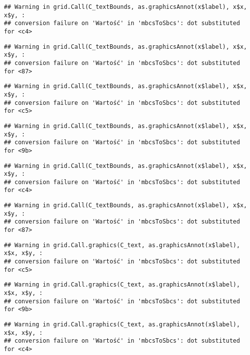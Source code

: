 \documentclass[
]{book}
\begin{document}
\begin{verbatim}
## Warning in grid.Call(C_textBounds, as.graphicsAnnot(x$label), x$x, x$y, :
## conversion failure on 'Wartość' in 'mbcsToSbcs': dot substituted for <c4>
\end{verbatim}

\begin{verbatim}
## Warning in grid.Call(C_textBounds, as.graphicsAnnot(x$label), x$x, x$y, :
## conversion failure on 'Wartość' in 'mbcsToSbcs': dot substituted for <87>
\end{verbatim}

\begin{verbatim}
## Warning in grid.Call(C_textBounds, as.graphicsAnnot(x$label), x$x, x$y, :
## conversion failure on 'Wartość' in 'mbcsToSbcs': dot substituted for <c5>
\end{verbatim}

\begin{verbatim}
## Warning in grid.Call(C_textBounds, as.graphicsAnnot(x$label), x$x, x$y, :
## conversion failure on 'Wartość' in 'mbcsToSbcs': dot substituted for <9b>
\end{verbatim}

\begin{verbatim}
## Warning in grid.Call(C_textBounds, as.graphicsAnnot(x$label), x$x, x$y, :
## conversion failure on 'Wartość' in 'mbcsToSbcs': dot substituted for <c4>
\end{verbatim}

\begin{verbatim}
## Warning in grid.Call(C_textBounds, as.graphicsAnnot(x$label), x$x, x$y, :
## conversion failure on 'Wartość' in 'mbcsToSbcs': dot substituted for <87>
\end{verbatim}

\begin{verbatim}
## Warning in grid.Call.graphics(C_text, as.graphicsAnnot(x$label), x$x, x$y, :
## conversion failure on 'Wartość' in 'mbcsToSbcs': dot substituted for <c5>
\end{verbatim}

\begin{verbatim}
## Warning in grid.Call.graphics(C_text, as.graphicsAnnot(x$label), x$x, x$y, :
## conversion failure on 'Wartość' in 'mbcsToSbcs': dot substituted for <9b>
\end{verbatim}

\begin{verbatim}
## Warning in grid.Call.graphics(C_text, as.graphicsAnnot(x$label), x$x, x$y, :
## conversion failure on 'Wartość' in 'mbcsToSbcs': dot substituted for <c4>
\end{verbatim}
\end{document}
